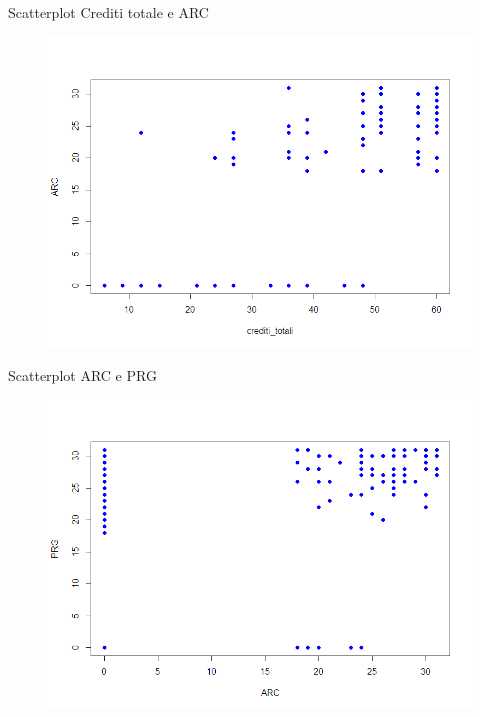 \documentclass{beamer}
\begin{document}
  \begin{frame}{Scatterplot Crediti totale e ARC}
    \begin{figure}[bt]
      \begin{center}
        \includegraphics[width=\textwidth]{../img/creditiArc.png}
      \end{center}
    \end{figure}
  \end{frame}

  \begin{frame}{Scatterplot ARC e PRG}
    \begin{figure}[bt]
      \begin{center}
        \includegraphics[width=\textwidth]{../img/arcPrg.png}
      \end{center}
    \end{figure}
  \end{frame}
\end{document}
